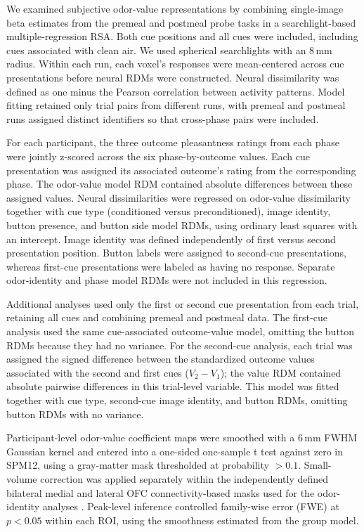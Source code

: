 \documentclass[12pt,letterpaper]{article}
\begin{document}
We examined subjective odor-value representations by combining single-image beta estimates from the premeal and postmeal probe tasks in a searchlight-based multiple-regression RSA. Both cue positions and all cues were included, including cues associated with clean air. We used spherical searchlights with an 8\,mm radius. Within each run, each voxel's responses were mean-centered across cue presentations before neural RDMs were constructed. Neural dissimilarity was defined as one minus the Pearson correlation between activity patterns. Model fitting retained only trial pairs from different runs, with premeal and postmeal runs assigned distinct identifiers so that cross-phase pairs were included.

For each participant, the three outcome pleasantness ratings from each phase were jointly z-scored across the six phase-by-outcome values. Each cue presentation was assigned its associated outcome's rating from the corresponding phase. The odor-value model RDM contained absolute differences between these assigned values. Neural dissimilarities were regressed on odor-value dissimilarity together with cue type (conditioned versus preconditioned), image identity, button presence, and button side model RDMs, using ordinary least squares with an intercept. Image identity was defined independently of first versus second presentation position. Button labels were assigned to second-cue presentations, whereas first-cue presentations were labeled as having no response. Separate odor-identity and phase model RDMs were not included in this regression.

Additional analyses used only the first or second cue presentation from each trial, retaining all cues and combining premeal and postmeal data. The first-cue analysis used the same cue-associated outcome-value model, omitting the button RDMs because they had no variance. For the second-cue analysis, each trial was assigned the signed difference between the standardized outcome values associated with the second and first cues ($V_2-V_1$); the value RDM contained absolute pairwise differences in this trial-level variable. This model was fitted together with cue type, second-cue image identity, and button RDMs, omitting button RDMs with no variance.

Participant-level odor-value coefficient maps were smoothed with a 6\,mm FWHM Gaussian kernel and entered into a one-sided one-sample t test against zero in SPM12, using a gray-matter mask thresholded at probability $>0.1$. Small-volume correction was applied separately within the independently defined bilateral medial and lateral OFC connectivity-based masks used for the odor-identity analyses \citep{kahnt2012connectivity}. Peak-level inference controlled family-wise error (FWE) at $p < 0.05$ within each ROI, using the smoothness estimated from the group model.
\end{document}

